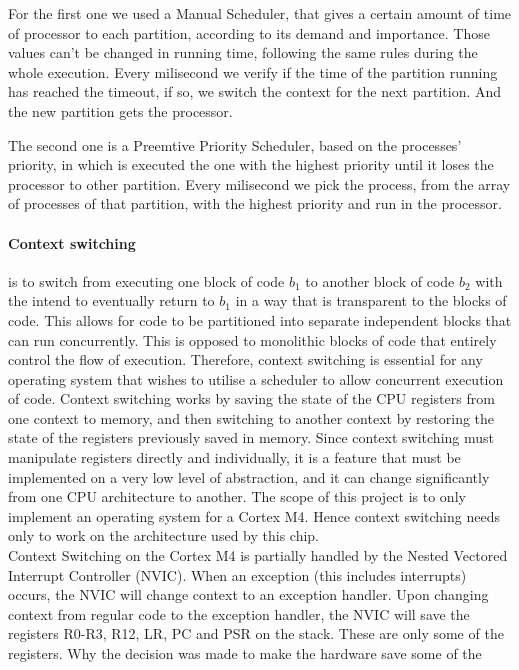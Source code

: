 For the first one we used a Manual Scheduler, that gives a certain amount of time of processor to each partition, according to its demand and importance. Those values can't be changed in running time, following the same rules during the whole execution. Every milisecond we verify if the time of the partition running has reached the timeout, if so, we switch the context for the next partition. And the new partition gets the processor.

The second one is a Preemtive Priority Scheduler, based on the processes' priority, in which is executed the one with the highest priority until it loses the processor to other partition. Every milisecond we pick the process, from the array of processes of that partition, with the highest priority and run in the processor.

\paragraph{Context switching} is to switch from executing one block of code $b_1$ to another block of code $b_2$
with the intend to eventually return to $b_1$ in a way that is transparent to the blocks of code.
This allows for code to be partitioned into separate independent blocks that can run concurrently.
This is opposed to monolithic blocks of code that entirely control the flow of execution.
Therefore, context switching is essential for any operating system that wishes to utilise a scheduler to allow concurrent execution of code.
Context switching works by saving the state of the CPU registers from one context to memory,
and then switching to another context by restoring the state of the registers previously saved in memory.
Since context switching must manipulate registers directly and individually, it is a feature that must be implemented
on a very low level of abstraction, and it can change significantly from one CPU architecture to another.
The scope of this project is to only implement an operating system for a Cortex M4. Hence context switching needs only
to work on the architecture used by this chip.\\
Context Switching on the Cortex M4 is partially handled by the Nested Vectored Interrupt Controller (NVIC).
When an exception (this includes interrupts) occurs, the NVIC will change context to an exception handler.
Upon changing context from regular code to the exception handler, the NVIC will save the registers R0-R3, R12, LR, PC and PSR
on the stack. These are only some of the registers. Why the decision was made to make the hardware save some of the
